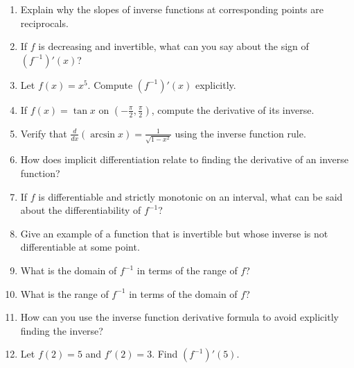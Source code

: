 \begin{enumerate}
  \item Explain why the slopes of inverse functions at corresponding points are reciprocals.
  \item If $f$ is decreasing and invertible, what can you say about the sign of $\left(f^{-1}\right)'(x)$?
  \item Let $f(x) = x^5$. Compute $\left(f^{-1}\right)'(x)$ explicitly.
  \item If $f(x) = \tan x$ on $\left(-\frac{\pi}{2}, \frac{\pi}{2}\right)$, compute the derivative of its inverse.
  \item Verify that $\frac{d}{dx}(\arcsin x) = \frac{1}{\sqrt{1 - x^2}}$ using the inverse function rule.
  \item How does implicit differentiation relate to finding the derivative of an inverse function?
  \item If $f$ is differentiable and strictly monotonic on an interval, what can be said about the differentiability of $f^{-1}$?
  \item Give an example of a function that is invertible but whose inverse is not differentiable at some point.
  \item What is the domain of $f^{-1}$ in terms of the range of $f$?
  \item What is the range of $f^{-1}$ in terms of the domain of $f$?
  \item How can you use the inverse function derivative formula to avoid explicitly finding the inverse?
  \item Let $f(2) = 5$ and $f'(2) = 3$. Find $\left(f^{-1}\right)'(5)$.
\end{enumerate}
